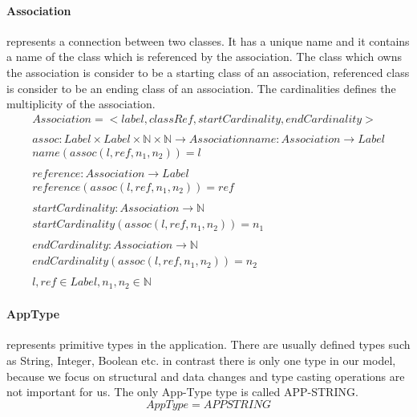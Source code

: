 \documentclass[11pt]{article}
\begin{document}
\paragraph {Association} represents a connection between two classes. It has a unique name and it contains a name of the class which is referenced by the association. The class which owns the association is consider to be a starting class of an association, referenced class is consider to be an ending class of an association. The cardinalities defines the multiplicity of the association.
\begin{gather*}
Association = <label, classRef, startCardinality, endCardinality> \\ \\
assoc : Label \times Label \times \mathbb{N} \times \mathbb{N} \rightarrow Association
name : Association \rightarrow Label \\
name(assoc(l, ref, n_1, n_2)) = l\\ \\
reference : Association \rightarrow Label \\
reference(assoc(l, ref, n_1, n_2)) = ref\\ \\
startCardinality : Association \rightarrow \mathbb{N} \\
startCardinality(assoc(l, ref, n_1, n_2)) = n_1\\ \\
endCardinality : Association \rightarrow \mathbb{N} \\
endCardinality(assoc(l, ref, n_1, n_2)) = n_2 \\ \\
l, ref \in Label,  n_1, n_2 \in \mathbb{N}
\end{gather*}



\paragraph{AppType} represents primitive types in the application. There are usually defined types such as String, Integer, Boolean etc. in contrast there is only one type in our model, because we focus on structural and data changes and type casting operations are not important for us. The only App-Type type is called APP-STRING.
$$
AppType = APPSTRING
$$
\end{document}
